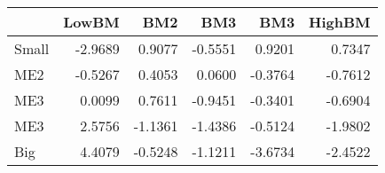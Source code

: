 \begin{tabular}{lrrrrr}
\toprule
{} &   LowBM &     BM2 &     BM3 &     BM3 &  HighBM \\
\midrule
Small & -2.9689 &  0.9077 & -0.5551 &  0.9201 &  0.7347 \\
ME2   & -0.5267 &  0.4053 &  0.0600 & -0.3764 & -0.7612 \\
ME3   &  0.0099 &  0.7611 & -0.9451 & -0.3401 & -0.6904 \\
ME3   &  2.5756 & -1.1361 & -1.4386 & -0.5124 & -1.9802 \\
Big   &  4.4079 & -0.5248 & -1.1211 & -3.6734 & -2.4522 \\
\bottomrule
\end{tabular}

